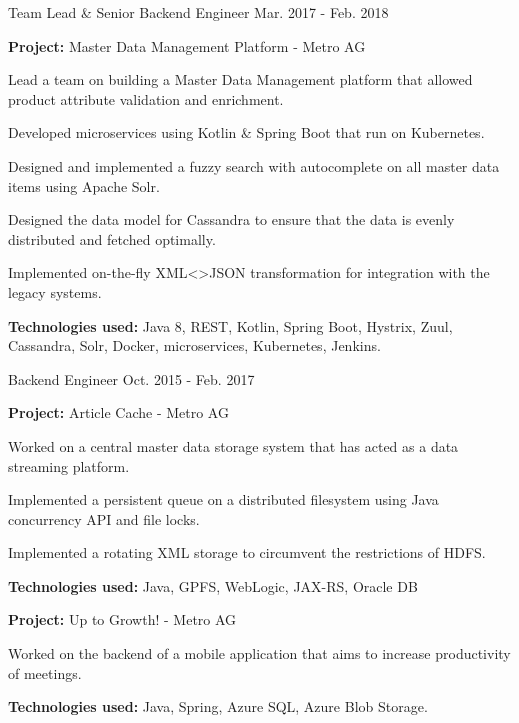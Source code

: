 \begin{cventries}
    \cventry
    {Team Lead \& Senior Backend Engineer}
    {}
    {}
    {Mar. 2017 - Feb. 2018}
    {
    \begin{cvitems}
        \item {
        \textbf{Project:} Master Data Management Platform - Metro AG
        }
        \newline
        \item {
        Lead a team on building a Master Data Management platform that allowed product attribute validation and enrichment.
        }
        \item {
        Developed microservices using Kotlin \& Spring Boot that run on Kubernetes.
        }
        \item {
        Designed and implemented a fuzzy search with autocomplete on all master data items using Apache Solr.
        }
        \item {
        Designed the data model for Cassandra to ensure that the data is evenly distributed and fetched optimally.
        }
        \item {
        Implemented on-the-fly XML<>JSON transformation for integration with the legacy systems.
        }
        \smallskip
        \item {
        \textbf{Technologies used:} Java 8, REST, Kotlin, Spring Boot, Hystrix, Zuul, Cassandra,
        Solr, Docker, microservices, Kubernetes, Jenkins.
        }
    \end{cvitems}
    }

    \cventry
    {Backend Engineer}
    {}
    {}
    {Oct. 2015 - Feb. 2017}
    {
    \begin{cvitems}
        \item {\textbf{Project:} Article Cache - Metro AG}
        \item {
        Worked on a central master data storage system that has acted as a data streaming platform.
        }
        \item {
        Implemented a persistent queue on a distributed filesystem using Java concurrency API and file locks.
        }
        \item {
        Implemented a rotating XML storage to circumvent the restrictions of HDFS.
        }
        \smallskip
        \item {\textbf{Technologies used:} Java, GPFS, WebLogic, JAX-RS, Oracle DB}
        \medskip
        \item {\textbf{Project:} Up to Growth! - Metro AG}
        \item {
        Worked on the backend of a mobile application that aims to increase productivity of meetings.
        }
        \smallskip
        \item {\textbf{Technologies used:} Java, Spring, Azure SQL, Azure Blob Storage.}
    \end{cvitems}
    }


\end{cventries}
